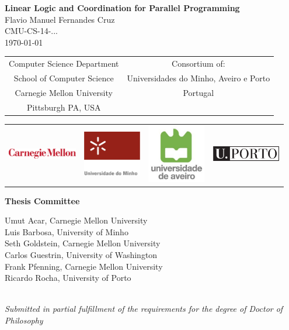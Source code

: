 
\begin{center}
{\huge \bf 
   Linear Logic and Coordination for Parallel Programming
}
\vspace{.25in}
{\LARGE
\\Flavio Manuel Fernandes Cruz\\}
\vspace{.25in}
{\large 
 CMU-CS-14-...
\\ \today \\}
 \vspace{.5in}

\setlength{\tabcolsep}{2em}
{\large
\begin{tabular}{cc}
\\ Computer Science Department & Consortium of:   \\
School of Computer Science & Universidades do Minho,  Aveiro e Porto \\
Carnegie Mellon University & Portugal \\
Pittsburgh PA, USA &  \\
\end{tabular}
}

\begin{tabular}{cccc}
\\ \includegraphics[width=1.2in]{logos/cmu.eps} & \includegraphics[width=1.0in]{logos/um.jpg}  & \includegraphics[width=1.0in]{logos/ua.jpg} & \includegraphics[width=1.2in]{logos/up.eps} \\
\end{tabular}

\vspace{0.3in}

{\bf Thesis Committee \\}

Umut Acar, Carnegie Mellon University\\
Luis Barbosa, University of Minho\\
Seth Goldstein, Carnegie Mellon University\\
Carlos Guestrin, University of Washington\\
Frank Pfenning, Carnegie Mellon University\\
Ricardo Rocha, University of Porto\\\
\vspace{0.4in}

\emph{Submitted in partial fulfillment of the requirements for the degree of Doctor of Philosophy}

\end{center}
